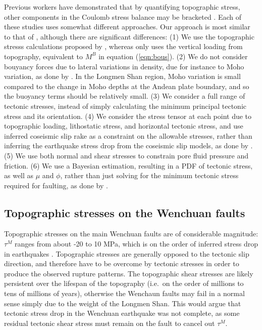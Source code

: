 \documentclass[draft,jgrga]{AGUTeX}
\begin{document}
\begin{article}
Previous workers have demonstrated that by quantifying topographic
stress, other components in the Coulomb stress balance may be bracketed
\citep[e.g.,][]{cattin1997, lamb2006, luttrell2011}. Each of these studies
uses somewhat different approaches. Our approach is most similar to that
of \citet{luttrell2011}, although there are significant
differences: (1) We use the topographic stresss calculations proposed by
\citet{liuzoback1992}, whereas 
\citet{luttrell2011} only uses the vertical loading from topography,
equivalent to $M^B$ in equation (\ref{eqn:bous}). (2) We do not consider
bouyancy forces due to lateral variations in density, due for instance to
Moho variation, as done by \citet{luttrell2011}. In the
Longmen Shan region, Moho variation is small compared to the change in
Moho depths at the Andean plate boundary, and so the buoyancy terms
should be relatively small. (3) We consider a full range of tectonic
stresses, instead of simply calculating the minimum principal tectonic
stress and its orientation. (4) We consider the stress tensor at each
point due to topographic loading, lithostatic stress, and horizontal
tectonic stress, and use inferred coseismic slip rake as a constraint on
the allowable stresses, rather than inferring the earthquake stress drop
from the coseismic slip models, as done by 
\citet{luttrell2011}. (5) We use both normal and shear stresses to
constrain pore fluid pressure and friction. (6) We use a Bayesian
estimation, resulting in a PDF of tectonic stress, as well as $\mu$ and
$\phi$, rather than just solving for the minimum tectonic stress
required for faulting, as done by \citet{luttrell2011}.

\subsection{Topographic stresses on the Wenchuan
faults}\label{topographic-stresses-on-the-wenchuan-faults}

Topographic stresses on the main Wenchuan faults are of considerable
magnitude: $\tau^M$ ranges from about -20 to 10 MPa, which is on the
order of inferred stress drop in earthquakes \citep[e.g.,][]{kanamori1975,
allmann2009}. Topographic stresses are
generally opposed to the tectonic slip direction, and therefore have to
be overcome by tectonic stresses in order to produce the observed
rupture patterns. The topographic shear stresses are likely persistent
over the lifespan of the topography (i.e.~on the order of millions to
tens of millions of years), otherwise the Wenchaun faults may fail in a
normal sense simply due to the weight of the Longmen Shan. This would
argue that tectonic stress drop in the Wenchuan earthquake was not
complete, as some residual tectonic shear stress must remain on the
fault to cancel out $\tau^M$.


\end{article}
\end{document}
